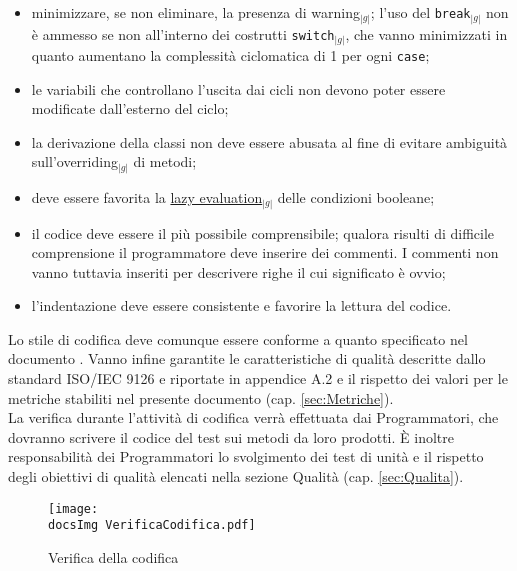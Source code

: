 {{{\begin{itemize}
			\item minimizzare, se non eliminare, la presenza di warning$_{|g|}$; l'uso del \texttt{break}$_{|g|}$ non è ammesso 
				  se non all'interno dei costrutti \texttt{switch}$_{|g|}$, che vanno minimizzati in quanto aumentano la 
				  complessità ciclomatica di 1 per ogni \texttt{case};		
			\item le variabili che controllano l'uscita dai cicli non devono poter essere modificate dall'esterno del ciclo;
			\item la derivazione della classi non deve essere abusata al fine di evitare ambiguità sull'overriding$_{|g|}$ 
				  di metodi;
			\item deve essere favorita la \underline{lazy evaluation}$_{|g|}$ delle condizioni booleane;
			\item il codice deve essere il più possibile comprensibile; qualora risulti di difficile comprensione il 
			      programmatore deve inserire dei commenti. I commenti non vanno tuttavia inseriti per descrivere righe 
			      il cui significato è ovvio;
			\item l'indentazione deve essere consistente e favorire la lettura del codice.
		\end{itemize}
		Lo stile di codifica deve comunque essere conforme a quanto specificato nel documento \textit{\NormeDiProgetto}. 
		Vanno infine garantite le caratteristiche di qualità descritte dallo standard ISO/IEC 9126 e riportate in appendice A.2  e il 
		rispetto dei valori per le metriche stabiliti nel presente documento (cap. \ref{sec:Metriche}).\\
		La verifica durante l'attività di codifica verrà effettuata dai Programmatori, che dovranno scrivere il codice del test sui 
		metodi da loro prodotti. \`E inoltre responsabilità dei Programmatori lo svolgimento dei test di unità e il rispetto 
		degli obiettivi di qualità elencati nella sezione Qualità (cap. \ref{sec:Qualita}).

		\begin{figure}[h!]
			\centering
			\texttt{[image: \\docsImg VerificaCodifica.pdf]}
			\caption{Verifica della codifica}
		\end{figure}
	}
}}
